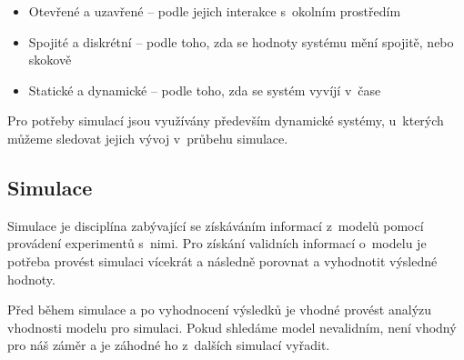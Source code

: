 \begin{itemize}
    \item Otevřené a uzavřené -- podle jejich interakce s~okolním prostředím
    \item Spojité a diskrétní -- podle toho, zda se hodnoty systému mění spojitě, nebo skokově
    \item Statické a dynamické -- podle toho, zda se systém vyvíjí v~čase
\end{itemize}
Pro potřeby simulací jsou využívány především dynamické systémy, u~kterých můžeme sledovat jejich vývoj v~průbehu simulace.

\subsection{Simulace}
Simulace je disciplína zabývající se získáváním informací z~modelů pomocí provádení experimentů s~nimi. Pro získání validních informací o~modelu je potřeba provést simulaci vícekrát a následně porovnat a vyhodnotit výsledné hodnoty.

Před během simulace a po vyhodnocení výsledků je vhodné provést analýzu vhodnosti modelu pro simulaci. Pokud shledáme model nevalidním, není vhodný pro náš záměr a je záhodné ho z~dalších simulací vyřadit.


